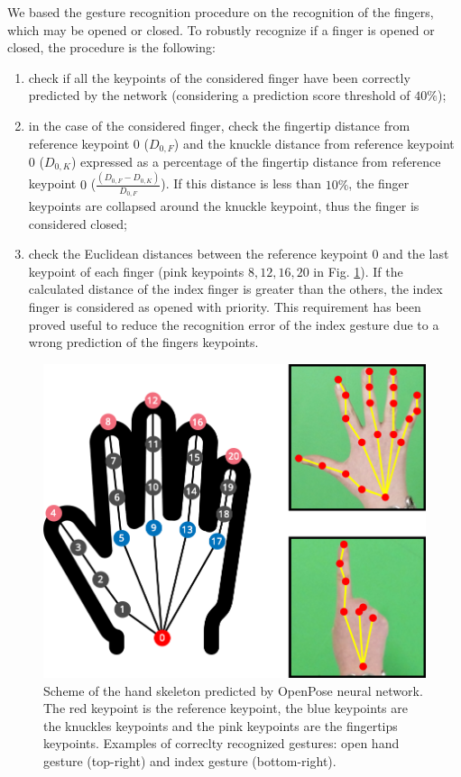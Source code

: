 \documentclass[a4paper, 10 pt, conference]{ieeeconf}      %
\begin{document}
We based the gesture recognition procedure on the recognition of the fingers, which may be opened or closed. To robustly recognize if a finger is opened or closed, the procedure is the following:
\begin{enumerate}
\item check if all the keypoints of the considered finger have been correctly predicted by the network (considering a prediction score threshold of $40\%$);
\item in the case of the considered finger, check the fingertip distance from reference keypoint $0$ ($D_{0,F}$) and the knuckle distance from reference keypoint $0$ ($D_{0,K}$) expressed as a percentage of the fingertip distance from reference keypoint $0$ ($\frac{(D_{0,F} - D_{0,K})}{D_{0,F}}$). If this distance is less than $10\%$, the finger keypoints are collapsed around the knuckle keypoint, thus the finger is considered closed;
\item check the Euclidean distances between the reference keypoint $0$ and the last keypoint of each finger (pink keypoints $8, 12, 16, 20$ in Fig. \ref{fig:keypoints}). If the calculated distance of the index finger is greater than the others, the index finger is considered as opened with priority. This requirement has been proved useful to reduce the recognition error of the index gesture due to a wrong prediction of the fingers keypoints.
\end{enumerate}

\begin{figure} [ht]
  \centering
  \includegraphics[width=1\columnwidth]{figures/keypoints}
  \caption{Scheme of the hand skeleton predicted by OpenPose neural network. The red keypoint is the reference keypoint, the blue keypoints are the knuckles keypoints and the pink keypoints are the fingertips keypoints. Examples of correclty recognized gestures: open hand gesture (top-right) and index gesture (bottom-right).}
  \label{fig:keypoints}
\end{figure}
\end{document}
